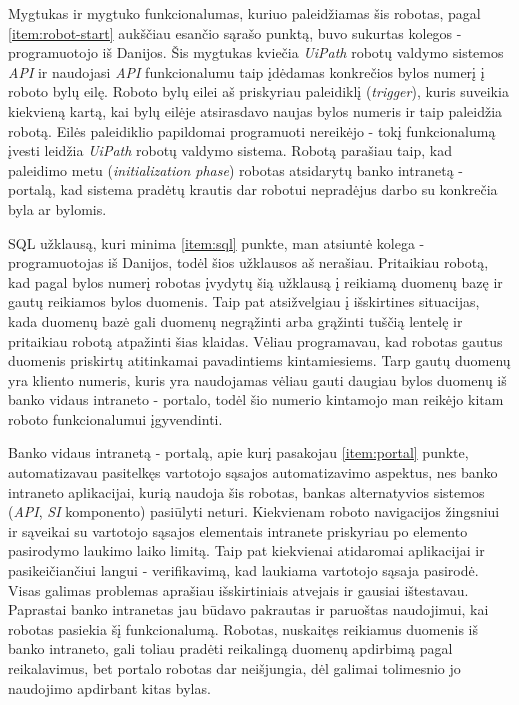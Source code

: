 \documentclass{VUMIFPSBakPrakAt}
\begin{document}
\vspace{10pt}
\par
Mygtukas ir mygtuko funkcionalumas, kuriuo paleidžiamas šis robotas, pagal \ref{item:robot-start} aukščiau esančio sąrašo punktą, buvo sukurtas kolegos - programuotojo iš Danijos. Šis mygtukas kviečia \textit{UiPath} robotų valdymo sistemos \textit{API} ir naudojasi \textit{API} funkcionalumu taip įdėdamas konkrečios bylos numerį į roboto bylų eilę. Roboto bylų eilei aš priskyriau paleidiklį (\textit{trigger}), kuris suveikia kiekvieną kartą, kai bylų eilėje atsirasdavo naujas bylos numeris ir taip paleidžia robotą. Eilės paleidiklio papildomai programuoti nereikėjo - tokį funkcionalumą įvesti leidžia \textit{UiPath} robotų valdymo sistema. Robotą parašiau taip, kad paleidimo metu (\textit{initialization phase}) robotas atsidarytų banko intranetą - portalą, kad sistema pradėtų krautis dar robotui nepradėjus darbo su konkrečia byla ar bylomis.
\par
SQL užklausą, kuri minima \ref{item:sql} punkte, man atsiuntė kolega - programuotojas iš Danijos, todėl šios užklausos aš nerašiau. Pritaikiau robotą, kad pagal bylos numerį robotas įvydytų šią užklausą į reikiamą duomenų bazę ir gautų reikiamos bylos duomenis. Taip pat atsižvelgiau į išskirtines situacijas, kada duomenų bazė gali duomenų negrąžinti arba grąžinti tuščią lentelę ir pritaikiau robotą atpažinti šias klaidas. Vėliau programavau, kad robotas gautus duomenis priskirtų atitinkamai pavadintiems kintamiesiems. Tarp gautų duomenų yra kliento numeris, kuris yra naudojamas vėliau gauti daugiau bylos duomenų iš banko vidaus intraneto - portalo, todėl šio numerio kintamojo man reikėjo kitam roboto funkcionalumui įgyvendinti.
\par
Banko vidaus intranetą - portalą, apie kurį pasakojau \ref{item:portal} punkte, automatizavau pasitelkęs vartotojo sąsajos automatizavimo aspektus, nes banko intraneto aplikacijai, kurią naudoja šis robotas, bankas alternatyvios sistemos (\textit{API}, \textit{SI} komponento) pasiūlyti neturi. Kiekvienam roboto navigacijos žingsniui ir sąveikai su vartotojo sąsajos elementais intranete priskyriau po elemento pasirodymo laukimo laiko limitą. Taip pat kiekvienai atidaromai aplikacijai ir pasikeičiančiui langui - verifikavimą, kad laukiama vartotojo sąsaja pasirodė. Visas galimas problemas aprašiau išskirtiniais atvejais ir gausiai ištestavau. Paprastai banko intranetas jau būdavo pakrautas ir paruoštas naudojimui, kai robotas pasiekia šį funkcionalumą. Robotas, nuskaitęs reikiamus duomenis iš banko intraneto, gali toliau pradėti reikalingą duomenų apdirbimą pagal reikalavimus, bet portalo robotas dar neišjungia, dėl galimai tolimesnio jo naudojimo apdirbant kitas bylas.
\end{document}
